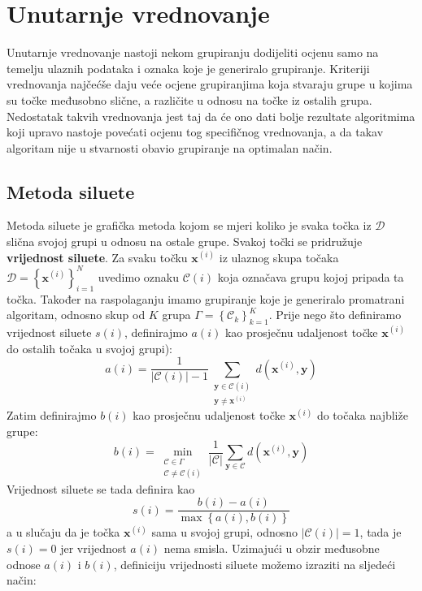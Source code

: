 \documentclass[times, utf8, zavrsni]{fer}
\begin{document}
\section{Unutarnje vrednovanje}
Unutarnje vrednovanje nastoji nekom grupiranju dodijeliti ocjenu samo na temelju ulaznih podataka i oznaka koje je generiralo grupiranje. Kriteriji vrednovanja najčećše daju veće ocjene grupiranjima koja stvaraju grupe u kojima su točke međusobno slične, a različite u odnosu na točke iz ostalih grupa. Nedostatak takvih vrednovanja jest taj da će ono dati bolje rezultate algoritmima koji upravo nastoje povećati ocjenu tog specifičnog vrednovanja, a da takav algoritam nije u stvarnosti obavio grupiranje na optimalan način.

\subsection{Metoda siluete}
Metoda siluete je grafička metoda kojom se mjeri koliko je svaka točka iz $\mathcal{D}$ slična svojoj grupi u odnosu na ostale grupe. Svakoj točki se pridružuje \textbf{vrijednost siluete}. Za svaku točku $\mathbf{x}^{(i)}$ iz ulaznog skupa točaka $\mathcal{D} = \left\{\mathbf{x}^{(i)}\right\}_{i=1}^{N}$ uvedimo oznaku $\mathcal{C} \left(i\right)$ koja označava grupu kojoj pripada ta točka. Također na raspolaganju imamo grupiranje koje je generiralo promatrani algoritam, odnosno skup od $K$ grupa $\Gamma = \left\{\mathcal{C}_k\right\}_{k=1}^{K}$.
Prije nego što definiramo vrijednost siluete $s (i)$, definirajmo $a (i)$ kao prosječnu udaljenost točke $\mathbf{x}^{(i)}$ do ostalih točaka u svojoj grupi):
\[a (i) = \frac{1}{\left\vert \mathcal{C} \left(i\right) \right\vert - 1} \sum_{\substack{\mathbf{y} \in \mathcal{C} \left(i\right) \\ \mathbf{y} \neq \mathbf{x}^{(i)}}} d \left(\mathbf{x}^{(i)}, \mathbf{y}\right)
\]
Zatim definirajmo $b (i)$ kao prosječnu udaljenost točke $\mathbf{x}^{(i)}$ do točaka najbliže grupe:
\[b (i) = \min_{\substack{\mathcal{C} \in \Gamma \\ \mathcal{C} \neq \mathcal{C} \left(i\right)}} \frac{1}{\vert \mathcal{C} \vert} \sum_{\mathbf{y} \in \mathcal{C}}
d \left(\mathbf{x}^{(i)}, \mathbf{y}\right)\]
Vrijednost siluete se tada definira kao
\[s (i) = \frac{b (i) - a (i)}{\operatorname{max} \left\{a (i), b (i)\right\}}\]
a u slučaju da je točka $\mathbf{x}^{(i)}$ sama u svojoj grupi, odnosno $\left\vert \mathcal{C} \left(i\right) \right\vert = 1$, tada je $s (i) = 0$ jer vrijednost $a (i)$ nema smisla. Uzimajući u obzir međusobne odnose $a (i)$ i $b (i)$, definiciju vrijednosti siluete možemo izraziti na sljedeći način:
\end{document}
